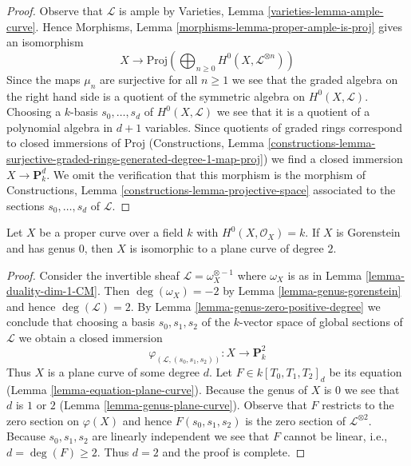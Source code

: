 \begin{proof}
\medskip\noindent
Observe that $\mathcal{L}$ is ample by
Varieties, Lemma \ref{varieties-lemma-ample-curve}.
Hence
Morphisms, Lemma \ref{morphisms-lemma-proper-ample-is-proj}
gives an isomorphism
$$
X \longrightarrow
\text{Proj}\left(
\bigoplus\nolimits_{n \geq 0} H^0(X, \mathcal{L}^{\otimes n})\right)
$$
Since the maps $\mu_n$ are surjective for all $n \geq 1$ we see that
the graded algebra on the right hand side is a quotient of
the symmetric algebra on $H^0(X, \mathcal{L})$. Choosing a $k$-basis
$s_0, \ldots, s_d$ of $H^0(X, \mathcal{L})$ we see that
it is a quotient of a polynomial algebra in $d + 1$ variables.
Since quotients of graded rings correspond to closed immersions
of $\text{Proj}$ (Constructions, Lemma
\ref{constructions-lemma-surjective-graded-rings-generated-degree-1-map-proj})
we find a closed immersion $X \to \mathbf{P}^d_k$. We omit the
verification that this morphism is the morphism of
Constructions, Lemma \ref{constructions-lemma-projective-space}
associated to the sections $s_0, \ldots, s_d$ of $\mathcal{L}$.
\end{proof}

\begin{lemma}
\label{lemma-genus-zero}
Let $X$ be a proper curve over a field $k$ with $H^0(X, \mathcal{O}_X) = k$.
If $X$ is Gorenstein and has genus $0$, then $X$
is isomorphic to a plane curve of degree $2$.
\end{lemma}

\begin{proof}
Consider the invertible sheaf $\mathcal{L} = \omega_X^{\otimes -1}$ where
$\omega_X$ is as in Lemma \ref{lemma-duality-dim-1-CM}. Then
$\deg(\omega_X) = -2$ by Lemma \ref{lemma-genus-gorenstein}
and hence $\deg(\mathcal{L}) = 2$. By
Lemma \ref{lemma-genus-zero-positive-degree}
we conclude that choosing a basis $s_0, s_1, s_2$ of the $k$-vector
space of global sections of $\mathcal{L}$ we obtain a closed immersion
$$
\varphi_{(\mathcal{L}, (s_0, s_1, s_2))} :
X \longrightarrow \mathbf{P}^2_k
$$
Thus $X$ is a plane curve of some degree $d$. Let $F \in k[T_0, T_1, T_2]_d$
be its equation (Lemma \ref{lemma-equation-plane-curve}).
Because the genus of $X$ is $0$ we see that $d$ is $1$ or $2$
(Lemma \ref{lemma-genus-plane-curve}). Observe that
$F$ restricts to the zero section on $\varphi(X)$ and hence
$F(s_0, s_1, s_2)$ is the zero section of $\mathcal{L}^{\otimes 2}$.
Because $s_0, s_1, s_2$ are linearly independent we see that $F$
cannot be linear, i.e., $d = \deg(F) \geq 2$. Thus $d = 2$
and the proof is complete.
\end{proof}

